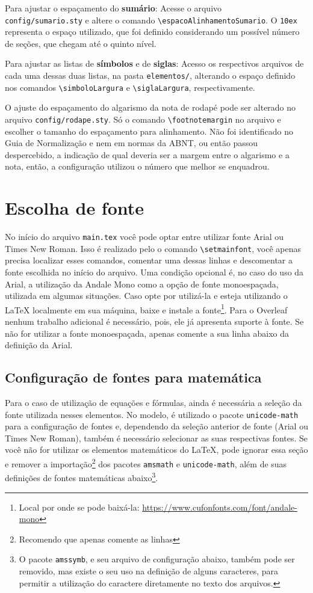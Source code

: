 Para ajustar o espaçamento do \textbf{sumário}: Acesse o arquivo \\\texttt{config/sumario.sty} e altere o comando \verb|\espacoAlinhamentoSumario|. O \texttt{10ex} representa o espaço utilizado, que foi definido considerando um possível número de seções, que chegam até o quinto nível.

Para ajustar as listas de \textbf{símbolos} e de \textbf{siglas}: Acesso os respectivos arquivos de cada uma dessas duas listas, na pasta \texttt{elementos/}, alterando o espaço definido nos comandos \verb|\simboloLargura| e \verb|\siglaLargura|, respectivamente.

O ajuste do espaçamento do algarismo da nota de rodapé pode ser alterado no arquivo \texttt{config/rodape.sty}. Só o comando \verb|\footnotemargin| no arquivo e escolher o tamanho do espaçamento para alinhamento. Não foi identificado no Guia de Normalização e nem em normas da ABNT, ou então passou despercebido, a indicação de qual deveria ser a margem entre o algarismo e a nota, então, a configuração utilizou o número que melhor se enquadrou.

\section{Escolha de fonte}
No início do arquivo \texttt{main.tex} você pode optar entre utilizar fonte Arial ou Times New Roman. Isso é realizado pelo o comando \verb|\setmainfont|, você apenas precisa localizar esses comandos, comentar uma dessas linhas e descomentar a fonte escolhida no início do arquivo. Uma condição opcional é, no caso do uso da Arial, a utilização da Andale Mono como a opção de fonte monoespaçada, utilizada em algumas situações. Caso opte por utilizá-la e esteja utilizando o \LaTeX{} localmente em sua máquina, baixe e instale a fonte\footnote{Local por onde se pode baixá-la: \url{https://www.cufonfonts.com/font/andale-mono}}. Para o Overleaf nenhum trabalho adicional é necessário, pois, ele já apresenta suporte à fonte. Se não for utilizar a fonte monoespaçada, apenas comente a sua linha abaixo da definição da Arial.

\subsection{Configuração de fontes para matemática}
Para o caso de utilização de equações e fórmulas, ainda é necessária a seleção da fonte utilizada nesses elementos. No modelo, é utilizado o pacote \texttt{unicode-math} para a configuração de fontes e, dependendo da seleção anterior de fonte (Arial ou Times New Roman), também é necessário selecionar as suas respectivas fontes. Se você não for utilizar os elementos matemáticos do \LaTeX{}, pode ignorar essa seção e remover a importação\footnote{Recomendo que apenas comente as linhas} dos pacotes \texttt{amsmath} e \texttt{unicode-math}, além de suas definições de fontes matemáticas abaixo\footnote{O pacote \texttt{amssymb}, e seu arquivo de configuração abaixo, também pode ser removido, mas existe o seu uso na definição de alguns caracteres, para permitir a utilização do caractere diretamente no texto dos arquivos.}.

